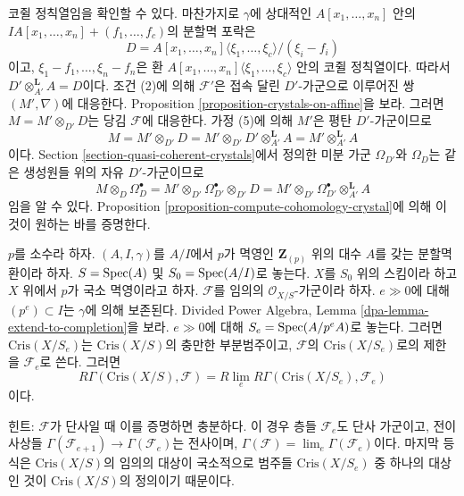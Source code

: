 \begin{remark}[기저변환 동형]
코쥘 정칙열임을 확인할 수 있다. 마찬가지로 $\gamma$에 상대적인
$A[x_1, \ldots, x_n]$ 안의
$IA[x_1, \ldots, x_n] + (f_1, \ldots, f_c)$의 분할멱 포락은
$$
D = A[x_1, \ldots, x_n]\langle \xi_1, \ldots, \xi_c\rangle/(\xi_i - f_i)
$$
이고, $\xi_1 - f_1, \ldots, \xi_n - f_n$은 환
$A[x_1, \ldots, x_n]\langle \xi_1, \ldots, \xi_c\rangle$ 안의
코쥘 정칙열이다. 따라서 $D' \otimes_{A'}^\mathbf{L} A = D$이다.
조건 (2)에 의해 $\mathcal{F}'$은 접속 달린 $D'$-가군으로 이루어진
쌍 $(M', \nabla)$에 대응한다. Proposition
\ref{proposition-crystals-on-affine}을 보라. 그러면
$M = M' \otimes_{D'} D$는 당김 $\mathcal{F}$에 대응한다. 가정 (5)에
의해 $M'$은 평탄 $D'$-가군이므로
$$
M = M' \otimes_{D'} D = M' \otimes_{D'} D' \otimes_{A'}^\mathbf{L} A
= M' \otimes_{A'}^\mathbf{L} A
$$
이다. Section \ref{section-quasi-coherent-crystals}에서 정의한 미분
가군 $\Omega_{D'}$와 $\Omega_D$는 같은 생성원들 위의 자유
$D'$-가군이므로
$$
M \otimes_D \Omega^\bullet_D =
M' \otimes_{D'} \Omega^\bullet_{D'} \otimes_{D'} D =
M' \otimes_{D'} \Omega^\bullet_{D'} \otimes_{A'}^\mathbf{L} A
$$
임을 알 수 있다. Proposition
\ref{proposition-compute-cohomology-crystal}에 의해 이것이 원하는
바를 증명한다.
\end{remark}

\begin{remark}[Rlim]
\label{remark-rlim}
$p$를 소수라 하자. $(A, I, \gamma)$를 $A/I$에서 $p$가 멱영인
$\mathbf{Z}_{(p)}$ 위의 대수 $A$를 갖는 분할멱환이라 하자.
$S = \mathop{\mathrm{Spec}}(A)$ 및 $S_0 = \mathop{\mathrm{Spec}}(A/I)$로 놓는다. $X$를 $S_0$ 위의
스킴이라 하고 $X$ 위에서 $p$가 국소 멱영이라고 하자. $\mathcal{F}$를 임의의
$\mathcal{O}_{X/S}$-가군이라 하자. $e \gg 0$에 대해
$(p^e) \subset I$는 $\gamma$에 의해 보존된다. Divided Power
Algebra, Lemma \ref{dpa-lemma-extend-to-completion}을 보라.
$e \gg 0$에 대해 $S_e = \mathop{\mathrm{Spec}}(A/p^eA)$로 놓는다. 그러면
$\text{Cris}(X/S_e)$는 $\text{Cris}(X/S)$의 충만한 부분범주이고,
$\mathcal{F}$의 $\text{Cris}(X/S_e)$로의 제한을 $\mathcal{F}_e$로
쓴다. 그러면
$$
R\Gamma(\text{Cris}(X/S), \mathcal{F}) =
R\lim_e R\Gamma(\text{Cris}(X/S_e), \mathcal{F}_e)
$$
이다.

\medskip\noindent
힌트: $\mathcal{F}$가 단사일 때 이를 증명하면 충분하다. 이 경우
층들 $\mathcal{F}_e$도 단사 가군이고, 전이 사상들
$\Gamma(\mathcal{F}_{e + 1}) \to \Gamma(\mathcal{F}_e)$는
전사이며, $\Gamma(\mathcal{F}) = \lim_e \Gamma(\mathcal{F}_e)$이다.
마지막 등식은 $\text{Cris}(X/S)$의 임의의 대상이 국소적으로 범주들
$\text{Cris}(X/S_e)$ 중 하나의 대상인 것이 $\text{Cris}(X/S)$의
정의이기 때문이다.
\end{remark}

